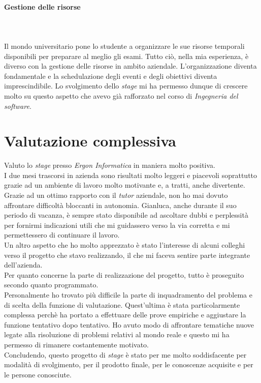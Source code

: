 \paragraph{Gestione delle risorse}\hfill\\\\
Il mondo universitario pone lo studente a organizzare le sue risorse temporali disponibili
per preparare al meglio gli esami. Tutto ciò, nella mia esperienza, è diverso con la
gestione delle risorse in ambito aziendale. L'organizzazione diventa fondamentale
e la schedulazione degli eventi e degli obiettivi diventa imprescindibile.
Lo svolgimento dello \textit{stage} mi ha permesso dunque di crescere molto su questo aspetto
che avevo già rafforzato nel corso di \textit{Ingegneria del software}.

\section{Valutazione complessiva}
\noindent Valuto lo \textit{stage} presso \textit{Ergon Informatica} in maniera molto positiva.\\
I due mesi trascorsi in azienda sono risultati molto leggeri e piacevoli soprattutto grazie
ad un ambiente di lavoro molto motivante e, a tratti, anche divertente.\\

\noindent Grazie ad un ottimo rapporto con il \textit{\textit{tutor}} aziendale, non ho mai dovuto
affrontare difficoltà bloccanti in autonomia. Gianluca, anche durante il suo periodo di vacanza, è sempre stato disponibile
ad ascoltare dubbi e perplessità per fornirmi indicazioni utili che mi guidassero
verso la via corretta e mi permettessero di continuare il lavoro.\\
Un altro aspetto che ho molto apprezzato è stato l'interesse di alcuni colleghi
verso il progetto che stavo realizzando, il che mi faceva sentire parte integrante
dell'azienda.\\

\noindent Per quanto concerne la parte di realizzazione del progetto, tutto è proseguito secondo quanto programmato.\\
Personalmente ho trovato più difficile la parte di inquadramento del problema e di scelta della funzione di valutazione.
Quest'ultima è stata particolarmente complessa perchè ha portato a
effettuare delle prove empiriche e aggiustare la funzione tentativo dopo tentativo.
Ho avuto modo di affrontare tematiche nuove legate alla risoluzione di problemi
relativi al mondo reale e questo mi ha permesso di rimanere costantemente motivato.\\

\noindent Concludendo, questo progetto di \textit{stage} è stato per me
molto soddisfacente per modalità di svolgimento, per il prodotto finale, per le conoscenze acquisite e per le persone conosciute.